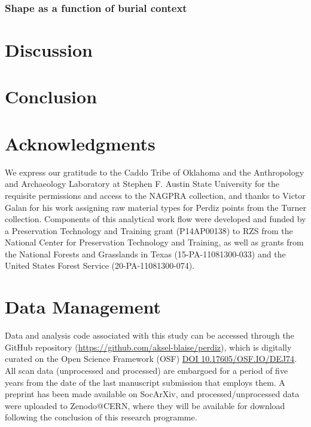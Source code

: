 \documentclass[review]{elsarticle}
\begin{document}
\subsubsection*{Shape as a function of burial context}



\section*{Discussion}



\section*{Conclusion}



\section*{Acknowledgments}

We express our gratitude to the Caddo Tribe of Oklahoma and the Anthropology and Archaeology Laboratory at Stephen F. Austin State University for the requisite permissions and access to the NAGPRA collection, and thanks to Victor Galan for his work assigning raw material types for Perdiz points from the Turner collection. Components of this analytical work flow were developed and funded by a Preservation Technology and Training grant (P14AP00138) to RZS from the National Center for Preservation Technology and Training, as well as grants from the National Forests and Grasslands in Texas (15-PA-11081300-033) and the United States Forest Service (20-PA-11081300-074).

\section*{Data Management}

Data and analysis code associated with this study can be accessed through the GitHub repository (\href{https://github.com/aksel-blaise/perdiz}{https://github.com/aksel-blaise/perdiz}), which is digitally curated on the Open Science Framework (OSF) \href{https://osf.io/dej74/}{DOI 10.17605/OSF.IO/DEJ74}. All scan data (unprocessed and processed) are embargoed for a period of five years from the date of the last manuscript submission that employs them. A preprint has been made available on SocArXiv, and processed/unprocessed data were uploaded to Zenodo@CERN, where they will be available for download following the conclusion of this research programme.
\end{document}
